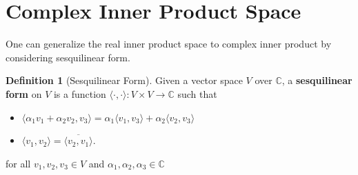 \documentclass[12pt, a4paper]{article}
\newcommand{\inner}[1]{\langle #1 \rangle}
\theoremstyle{remark}
\theoremstyle{definition}
\newtheorem{definition}{Definition}
\numberwithin{equation}{section}
\numberwithin{definition}{section}
\numberwithin{example}{section}
\numberwithin{exercise}{section}
\numberwithin{remark}{section}
\numberwithin{figure}{section}
\begin{document}
\section{Complex Inner Product Space}
One can generalize the real inner product space to complex inner product by considering
sesquilinear form.
\begin{definition}[Sesquilinear Form]
    Given a vector space $V$ over $\mathbb{C}$,
    a \textbf{sesquilinear form} on $V$ is a function $\inner{\cdot, \cdot} : V \times V \rightarrow \mathbb{C}$
    such that
    \begin{itemize}
        \item $\inner{\alpha_1 v_1 + \alpha_2 v_2, v_3} = \alpha_1 \inner{v_1, v_3} + \alpha_2 \inner{v_2, v_3}$
        \item $\inner{v_1, v_2} = \overline{\inner{v_2, v_1}}$.
    \end{itemize}
    for all $v_1, v_2, v_3 \in V$ and $\alpha_1, \alpha_2, \alpha_3 \in \mathbb{C}$
\end{definition}
\end{document}
